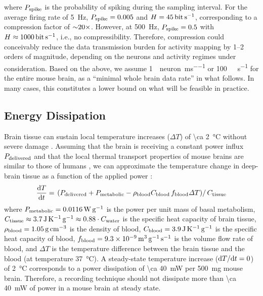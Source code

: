 where $P_{\text{\scriptsize spike}}$ is the probability of spiking during the sampling interval.
For the average firing rate of \SI{5}{\hertz}, $P_{\text{\scriptsize spike}}=0.005$ and $H=\SI{45}{\bit\per\second}$, corresponding to a compression factor of ${\sim} 20\times$.
However, at \SI{500}{\hertz}, $P_{\text{\scriptsize spike}}=0.5$ with $H\approx\SI{1000}{\bit\per\second}$, i.e., no compressibility. 
Therefore, compression could conceivably reduce the data transmission burden for activity mapping by 1--2 orders of magnitude, depending on the neurons and activity regimes under consideration.
Based on the above, we assume \SI{1}{\bit\per neuron\per\milli\second} or \SI{100}{\giga\bit\per\second} for the entire mouse brain, as a ``minimal whole brain data rate'' in what follows.
In many cases, this constitutes a lower bound on what will be feasible in practice.

\subsection{Energy Dissipation}

Brain tissue can sustain local temperature increases ($\Delta T$) of \SI{\ca 2}{\celsius} without severe damage \cite{azevedo09}.
Assuming that the brain is receiving a constant power influx $P_{\text{\scriptsize delivered}}$ and that the local thermal transport properties of mouse brains are similar to those of humans \cite{allen02}, we can approximate the temperature change in deep-brain tissue as a function of the applied power \cite{sotero11}:
\[\frac{\text{d} T}{\text{d} t} = \left.\left(P_{\text{\scriptsize delivered}} + P_{\text{\scriptsize metabolic}} - \rho_{\text{\scriptsize blood}} C_{\text{\scriptsize blood}}\,f_{\text{\scriptsize blood}} \Delta T\right)\right/C_{\text{\scriptsize tissue}}\]
where $P_{\text{\scriptsize metabolic}} = \SI{0.0116}{\watt\per\gram}$ is the power per unit mass of basal metabolism, $C_{\text{\scriptsize tissue}} \approx \SI{3.7}{\joule\per\kelvin\per\gram} \approx 0.88\cdot C_{\text{\scriptsize water}}$ is the specific heat capacity of brain tissue, $\rho_{\text{\scriptsize blood}}=\SI{1.05}{\gram\per\centi\meter\cubed}$ is the density of blood, $C_{\text{\scriptsize blood}} = \SI{3.9}{\joule\per\kelvin\per\gram}$ is the specific heat capacity of blood, $f_{\text{\scriptsize blood}} = \SI{9.3e-9}{\meter\cubed\per\gram\per\second}$ is the volume flow rate of blood, and $\Delta T$ is the temperature difference between the brain tissue and the blood (at temperature \SI{37}{\celsius}).
A steady-state temperature increase ($\text{d} T/\text{d} t = 0$) of \SI{2}{\celsius} corresponds to a power dissipation of \SI{\ca 40}{\milli\watt} per \SI{500}{\milli\gram} mouse brain.
Therefore, a recording technique should not dissipate more than \SI{\ca 40}{\milli\watt} of power in a mouse brain at steady state.

